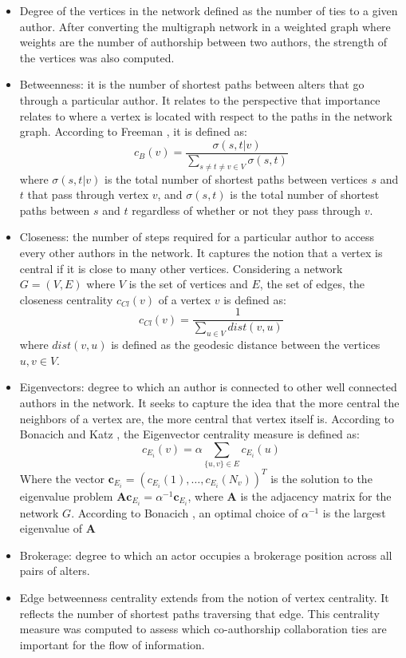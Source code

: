 \begin{itemize}
\item Degree of the vertices in the network defined as the number of ties to a given author. After converting the multigraph network in a weighted graph where weights are the number of authorship between two authors, the strength of the vertices was also computed.
\item Betweenness: it is the number of shortest paths between alters that go through a particular author. It relates to the perspective that importance relates to where a vertex is located with respect to the paths in the network graph. According to Freeman \cite{freeman_set_1977}, it is defined as:
\begin{equation} 
c_{B}(v)=\frac{\sigma (s,t|v)}{\sum_{s \neq t \neq v \in V}\sigma (s,t)} 
\end{equation} where $\sigma(s,t|v)$ is the total number of shortest paths between vertices $s$ and $t$ that pass through vertex $v$, and $\sigma (s,t)$ is the total number of shortest paths between $s$ and $t$ regardless of whether or not they pass through $v$.
\item Closeness: the number of steps required for a particular author to access every other authors in the network. It captures the notion that a vertex is central if it is close to many other vertices. Considering a network $G=(V,E)$ where $V$ is the set of vertices and $E$, the set of edges, the closeness centrality $c_{Cl}(v)$ of a vertex $v$ is defined as:
\begin{equation} c_{Cl}(v)=\frac{1}{\sum_{u\in V}dist(v,u)} \end{equation} where $dist(v,u)$ is defined as the geodesic distance between the vertices $u,v \in V$.
\item Eigenvectors: degree to which an author is connected to other well connected authors in the network. It seeks to capture the idea that the more central the neighbors of a vertex are, the more central that vertex itself is. According to Bonacich \cite{bonacich_factoring_1972} and Katz \cite{katz_new_1953}, the Eigenvector centrality measure is defined as:
\begin{equation} c_{E_i}(v)=\alpha \sum_{\{u,v\}\in E}c_{E_i}(u) \end{equation} Where the vector $\mathbf{c}_{E_i}=(c_{E_i}(1),\dots ,c_{E_i}(N_v))^T$ is the solution to the eigenvalue problem $\mathbf{Ac}_{E_i}=\alpha^{-1}\mathbf{c}_{E_i}$, where $\mathbf{A}$ is the adjacency matrix for the network $G$. According to Bonacich \cite{bonacich_factoring_1972}, an optimal choice of $\alpha^{-1}$ is the largest eigenvalue of $\mathbf{A}$
\item Brokerage: degree to which an actor occupies a brokerage position across all pairs of alters.
\item Edge betweenness centrality extends from the notion of vertex centrality. It reflects the number of shortest paths traversing that edge. This centrality measure was computed to assess which co-authorship collaboration ties are important for the flow of information.
\end{itemize}

